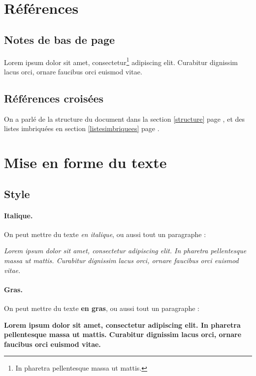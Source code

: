 \documentclass[a4paper, 11pt]{article}
\begin{document}
\clearpage
  \section{Références}

    \subsection{Notes de bas de page}

    Lorem ipsum dolor sit amet, consectetur\footnote{In pharetra pellentesque massa ut mattis.} adipiscing elit. Curabitur dignissim lacus orci, ornare faucibus orci euismod vitae.

    \subsection{Références croisées}

    On a parlé de la structure du document dans la section \ref{structure} page \pageref{structure}, et des listes imbriquées en section \ref{listesimbriquees} page \pageref{listesimbriquees}.

\clearpage
  \section{Mise en forme du texte}

    \subsection{Style}

      \paragraph{Italique. } On peut mettre du texte \textit{en italique}, ou aussi tout un paragraphe :

      {\itshape Lorem ipsum dolor sit amet, consectetur adipiscing elit. In pharetra pellentesque massa ut mattis. Curabitur dignissim lacus orci, ornare faucibus orci euismod vitae.}

      \paragraph{Gras. } On peut mettre du texte \textbf{en gras}, ou aussi tout un paragraphe :

      {\bfseries Lorem ipsum dolor sit amet, consectetur adipiscing elit. In pharetra pellentesque massa ut mattis. Curabitur dignissim lacus orci, ornare faucibus orci euismod vitae.}
\end{document}

